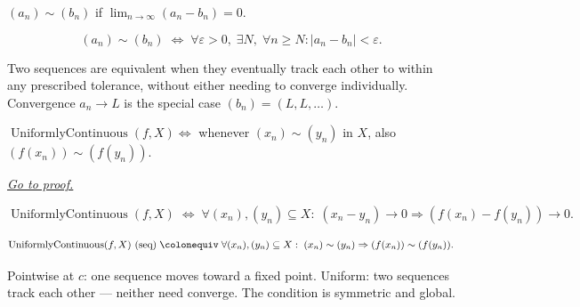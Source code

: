 \begin{definition}
\label{def:equivalent-sequences}
$(a_n)\sim(b_n)$ if $\lim_{n\to\infty}(a_n-b_n)=0$.
\end{definition}

\begin{remark*}
\[
  (a_n)\sim(b_n)
  \;\iff\;
  \forall\varepsilon>0,\;\exists N,\;\forall n\geq N:
  |a_n-b_n|<\varepsilon.
\]
\end{remark*}

\begin{remark*}[Interpretation]
Two sequences are equivalent when they eventually track each other
to within any prescribed tolerance, without either needing to converge
individually. Convergence $a_n\to L$ is the special case $(b_n)=(L,L,\ldots)$.
\end{remark*}


\begin{proposition}
\label{prop:sequential-uniform-continuity}
$\operatorname{UniformlyContinuous}(f,X)\iff$ whenever
$(x_n)\sim(y_n)$ in $X$, also $(f(x_n))\sim(f(y_n))$.

\smallskip\noindent
\hyperref[prf:sequential-uniform-continuity]{\textit{Go to proof.}}
\end{proposition}

\begin{remark*}
\[
  \operatorname{UniformlyContinuous}(f,X)
  \;\iff\;
  \forall(x_n),(y_n)\subseteq X:\;
  (x_n-y_n)\to 0 \Rightarrow (f(x_n)-f(y_n))\to 0.
\]
\end{remark*}

\begin{remark*}
\[
  \operatorname{UniformlyContinuous}(f,X)\text{ (seq)}
  \;\colonequiv\;
  \forall(x_n),(y_n)\subseteq X:\;
  (x_n)\sim(y_n) \Rightarrow (f(x_n))\sim(f(y_n)).
\]
\end{remark*}

\begin{remark*}
Pointwise at $c$: one sequence moves toward a fixed point.
Uniform: two sequences track each other — neither need converge.
The condition is symmetric and global.
\end{remark*}

